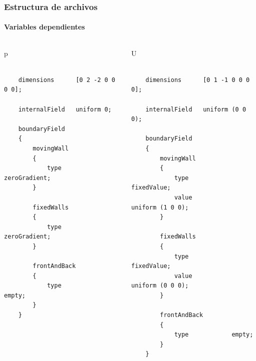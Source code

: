 \begin{frame}[fragile]
    \frametitle{Estructura de archivos}
    \framesubtitle{Variables dependientes}

\vspace{-0.8cm}
    \begin{columns}
        
            
            \begin{block}{\centering p}
        
            \tiny
            \begin{verbatim}

    dimensions      [0 2 -2 0 0 0 0];

    internalField   uniform 0;

    boundaryField
    {
        movingWall
        {
            type            zeroGradient;
        }

        fixedWalls
        {
            type            zeroGradient;
        }

        frontAndBack
        {
            type            empty;
        }
    }       
            \end{verbatim}                
            \end{block}

                
        
            \begin{block}{\centering U}

        \tiny
        \begin{verbatim}

    dimensions      [0 1 -1 0 0 0 0];

    internalField   uniform (0 0 0);

    boundaryField
    {
        movingWall
        {
            type            fixedValue;
            value           uniform (1 0 0);
        }

        fixedWalls
        {
            type            fixedValue;
            value           uniform (0 0 0);
        }

        frontAndBack
        {
            type            empty;
        }
    }                  
        \end{verbatim}
                
            \end{block}        

        
    \end{columns}
    


\end{frame} 







